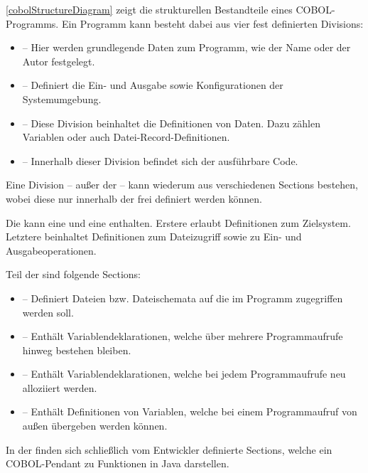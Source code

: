 \autoref{cobolStructureDiagram} zeigt die strukturellen Bestandteile eines COBOL-Programms. 
Ein Programm kann besteht dabei aus vier fest definierten Divisions:

\begin{itemize}
    \item {} -- Hier werden grundlegende Daten zum Programm, wie der Name oder der Autor festgelegt.
    \item {} -- Definiert die Ein- und Ausgabe sowie Konfigurationen der Systemumgebung.
    \item {} -- Diese Division beinhaltet die Definitionen von Daten. Dazu zählen Variablen oder auch Datei-Record-Definitionen.
    \item {} -- Innerhalb dieser Division befindet sich der ausführbare Code.
\end{itemize}

Eine Division -- außer der  -- kann wiederum aus verschiedenen Sections bestehen, wobei diese nur innerhalb der  frei definiert werden können.

Die  kann eine  und eine  enthalten. Erstere erlaubt Definitionen zum Zielsystem. Letztere beinhaltet Definitionen zum Dateizugriff sowie zu Ein- und Ausgabeoperationen.

Teil der  sind folgende Sections:
\begin{itemize}
    \item {} -- Definiert Dateien bzw. Dateischemata auf die im Programm zugegriffen werden soll.
    \item {} -- Enthält Variablendeklarationen, welche über mehrere Programmaufrufe hinweg bestehen bleiben.
    \item {} -- Enthält Variablendeklarationen, welche bei jedem Programmaufrufe neu alloziiert werden.
    \item {} -- Enthält Definitionen von Variablen, welche bei einem Programmaufruf von außen übergeben werden können.
\end{itemize}

In der  finden sich schließlich vom Entwickler definierte Sections, welche ein COBOL-Pendant zu Funktionen in Java darstellen.

